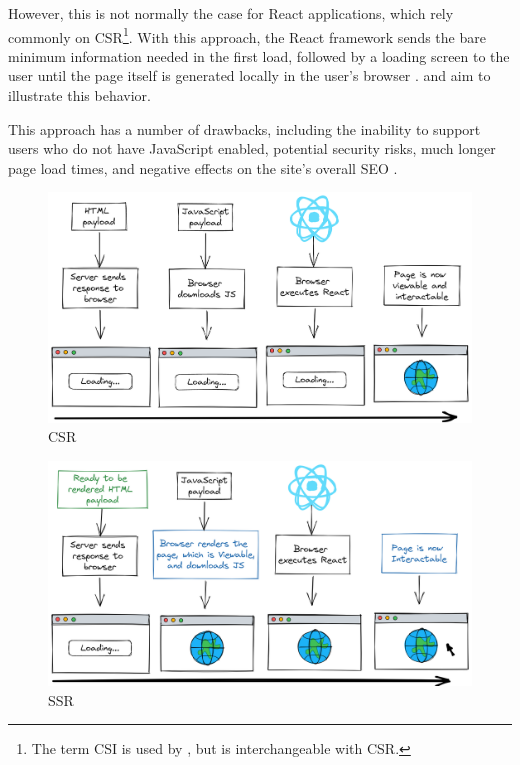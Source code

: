 \begin{description}
    However, this is not normally the case for React applications, which rely commonly on \ac{CSR}\footnote{The term \ac{CSI} is used by , but is interchangeable with \acl{CSR}.}. With this approach, the React framework sends the bare minimum information needed in the first load, followed by a loading screen to the user until the page itself is generated locally in the user's browser \cite{DBLP:journals/corr/abs-0801-2618}.  and  aim to illustrate this behavior.

    This approach has a number of drawbacks, including the inability to support users who do not have JavaScript enabled, potential security risks, much longer page load times, and negative effects on the site's overall \ac{SEO} \cite{Thakkar2020}.

    \begin{figure}[!htb]
      \caption{\acl{CSR}}\label{fig:csr}
      \begin{center}
        \includegraphics[width=14cm]{img/6-csr.png}
      \end{center}
    \end{figure}

    \begin{figure}[!htb]
      \caption{\acl{SSR}}\label{fig:ssr}
      \begin{center}
        \includegraphics[width=14cm]{img/6-ssr.png}
      \end{center}
    \end{figure}


\end{description}
